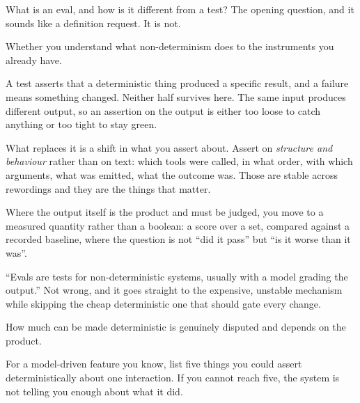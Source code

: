 \begin{bankq}{What is an eval, and how is it different from a test?}
\qasked
The opening question, and it sounds like a definition request. It is not.

\qtested
Whether you understand what non-determinism does to the instruments you
already have.

\qstaff
A test asserts that a deterministic thing produced a specific result, and a
failure means something changed. Neither half survives here. The same input
produces different output, so an assertion on the output is either too loose to
catch anything or too tight to stay green.

What replaces it is a shift in what you assert about. Assert on \emph{structure
and behaviour} rather than on text: which tools were called, in what order,
with which arguments, what was emitted, what the outcome was. Those are
stable across rewordings and they are the things that matter.

Where the output itself is the product and must be judged, you move to a
measured quantity rather than a boolean: a score over a set, compared against a
recorded baseline, where the question is not ``did it pass'' but ``is it worse
than it was''.


\qsenior
``Evals are tests for non-deterministic systems, usually with a model grading
the output.'' Not wrong, and it goes straight to the expensive, unstable
mechanism while skipping the cheap deterministic one that should gate every
change.

\qcontested
How much can be made deterministic is genuinely disputed and depends on the
product. 

\qdrill
For a model-driven feature you know, list five things you could assert
deterministically about one interaction. If you cannot reach five, the system
is not telling you enough about what it did.
\end{bankq}

